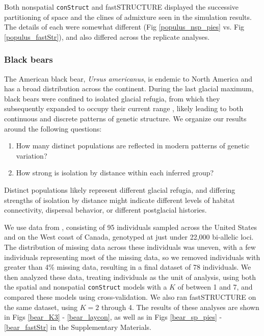 \documentclass[10pt,letterpaper]{article}
\begin{document}
Both nonspatial \texttt{conStruct} and fastSTRUCTURE displayed 
the successive partitioning of space and the clines of admixture seen in the simulation results.
The details of each were somewhat different 
(Fig \ref{populus_nsp_pies} vs. Fig \ref{populus_fastStr}), 
and also differed across the replicate analyses.

\subsubsection*{Black bears}

The American black bear, \textit{Ursus americanus}, is endemic to North America
and has a broad distribution across the continent.
During the last glacial maximum, 
black bears were confined to isolated glacial refugia, 
from which they subsequently expanded to occupy their current range
\cite{WoodingWard1997,Byun1997,Stone2000,Puckett2015},
likely leading to both continuous and discrete patterns of genetic structure.
We organize our results around the following questions:
\begin{enumerate}
    \item How many distinct populations
        are reflected in modern patterns of genetic variation?
    \item How strong is isolation by distance within each inferred group?
\end{enumerate}
Distinct populations likely represent different glacial refugia,
and differing strengths of isolation by distance might indicate 
different levels of habitat connectivity,
dispersal behavior,
or different postglacial histories.

We use data from \cite{Puckett2015}, consisting of 95 individuals 
sampled across the United States and on the West coast of Canada,
genotyped at just under 22,000 bi-allelic loci.
The distribution of missing data across these individuals was uneven, 
with a few individuals representing most of the missing data, 
so we removed individuals with greater than 4\% missing data, 
resulting in a final dataset of 78 individuals.
We then analyzed these data, treating individuals as the unit of analysis, 
using both the spatial and nonspatial \texttt{conStruct} models with a $K$ of between 1 and 7, 
and compared these models using cross-validation.
We also ran fastSTRUCTURE \cite{fastStructure} on the same dataset, 
using $K = 2$ through 4.
The results of these analyses are shown in Figs \ref{bear_K3} - \ref{bear_laycon}, 
as well as in Figs \ref{bear_sp_pies} - \ref{bear_fastStr} in the Supplementary Materials.
\end{document}
